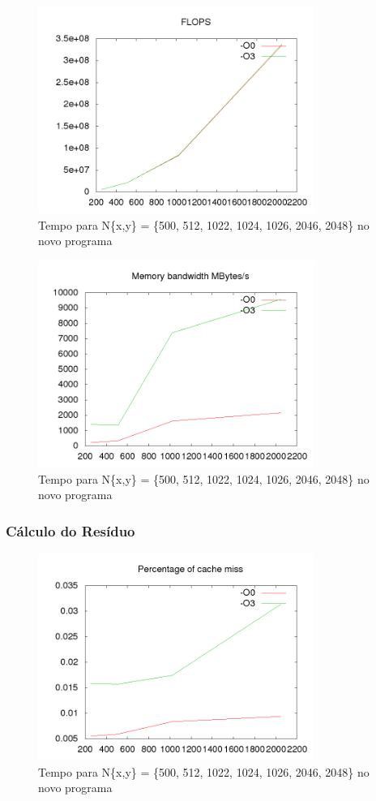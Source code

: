 \documentclass[12pt]{article}
\begin{document}
		\begin{figure}[ht!]
			\centering
			\includegraphics[width=90mm]{new_gs_flops.png}
			\caption{Tempo para N\{x,y\} = \{500, 512, 1022, 1024, 1026, 2046, 2048\} no novo programa
			\label{overflow}}
		\end{figure}
		\newpage
		
		\begin{figure}[ht!]
			\centering
			\includegraphics[width=90mm]{new_gs_mem.png}
			\caption{Tempo para N\{x,y\} = \{500, 512, 1022, 1024, 1026, 2046, 2048\} no novo programa
			\label{overflow}}
		\end{figure}
		\newpage
		
		\subsubsection{Cálculo do Resíduo}
		\begin{figure}[ht!]
			\centering
			\includegraphics[width=90mm]{new_res_cache.png}
			\caption{Tempo para N\{x,y\} = \{500, 512, 1022, 1024, 1026, 2046, 2048\} no novo programa
			\label{overflow}}
		\end{figure}
		\newpage
		
\end{document}
